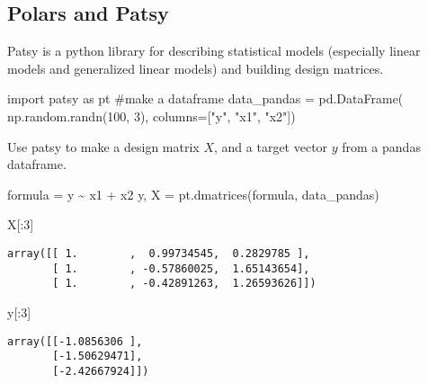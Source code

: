 \documentclass[
  letterpaper,
  DIV=11,
  numbers=noendperiod]{scrartcl}
\newenvironment{Shaded}{\begin{snugshade}}{\end{snugshade}}
\newcommand{\CommentTok}[1]{\textcolor[rgb]{0.37,0.37,0.37}{#1}}
\newcommand{\DecValTok}[1]{\textcolor[rgb]{0.68,0.00,0.00}{#1}}
\newcommand{\ImportTok}[1]{\textcolor[rgb]{0.00,0.46,0.62}{#1}}
\newcommand{\NormalTok}[1]{\textcolor[rgb]{0.00,0.23,0.31}{#1}}
\newcommand{\OperatorTok}[1]{\textcolor[rgb]{0.37,0.37,0.37}{#1}}
\newcommand{\StringTok}[1]{\textcolor[rgb]{0.13,0.47,0.30}{#1}}
\begin{document}
\hypertarget{polars-and-patsy}{%
\subsection{Polars and Patsy}\label{polars-and-patsy}}

Patsy is a python library for describing statistical models (especially
linear models and generalized linear models) and building design
matrices.

\begin{Shaded}
\begin{Highlighting}[]
\ImportTok{import}\NormalTok{ patsy }\ImportTok{as}\NormalTok{ pt}
\CommentTok{\#make a dataframe}
\NormalTok{data\_pandas }\OperatorTok{=}\NormalTok{ pd.DataFrame(}
\NormalTok{    np.random.randn(}\DecValTok{100}\NormalTok{, }\DecValTok{3}\NormalTok{), }
\NormalTok{    columns}\OperatorTok{=}\NormalTok{[}\StringTok{"y"}\NormalTok{, }\StringTok{"x1"}\NormalTok{, }\StringTok{"x2"}\NormalTok{])}
\end{Highlighting}
\end{Shaded}

Use patsy to make a design matrix \(X\), and a target vector \(y\) from
a pandas dataframe.

\begin{Shaded}
\begin{Highlighting}[]
\NormalTok{formula }\OperatorTok{=} \StringTok{\textquotesingle{}y \textasciitilde{} x1 + x2\textquotesingle{}}
\NormalTok{y, X }\OperatorTok{=}\NormalTok{ pt.dmatrices(formula, data\_pandas)}

\NormalTok{X[:}\DecValTok{3}\NormalTok{]}
\end{Highlighting}
\end{Shaded}

\begin{verbatim}
array([[ 1.        ,  0.99734545,  0.2829785 ],
       [ 1.        , -0.57860025,  1.65143654],
       [ 1.        , -0.42891263,  1.26593626]])
\end{verbatim}

\begin{Shaded}
\begin{Highlighting}[]
\NormalTok{y[:}\DecValTok{3}\NormalTok{]}
\end{Highlighting}
\end{Shaded}

\begin{verbatim}
array([[-1.0856306 ],
       [-1.50629471],
       [-2.42667924]])
\end{verbatim}
\end{document}
